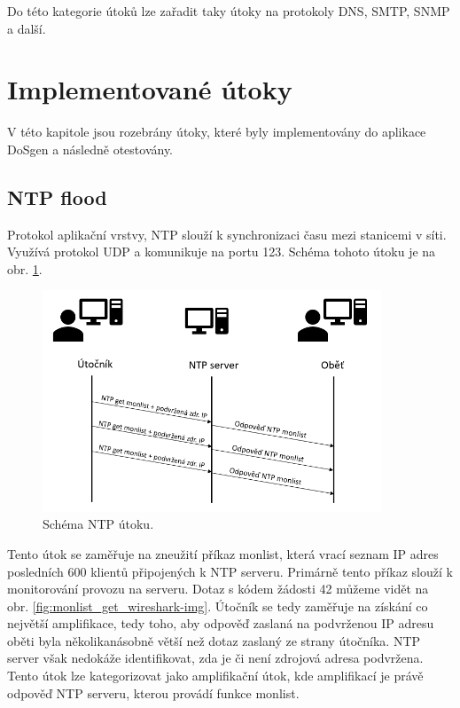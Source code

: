Do této kategorie útoků lze zařadit taky útoky na protokoly DNS, SMTP, SNMP a další.

\section{Implementované útoky}
\label{sec:implementovane_utoky}
V této kapitole jsou rozebrány útoky, které byly implementovány do aplikace DoSgen a následně otestovány.

\subsection{NTP flood}
\label{subsec:ntp_flood}
Protokol aplikační vrstvy, NTP slouží k synchronizaci času mezi stanicemi v síti.
Využívá protokol UDP a komunikuje na portu 123. Schéma tohoto útoku je na obr. \ref{fig:ntp_schema-img}.

\begin{figure} [ht]
	\centering
	\includegraphics[width=0.9\textwidth]{obrazky/ntp_flood_schema.png}
	\caption{Schéma NTP útoku.}
	\label{fig:ntp_schema-img}
\end{figure}

Tento útok se zaměřuje na zneužití příkaz monlist, která vrací seznam IP adres
posledních 600 klientů připojených k NTP serveru. Primárně tento příkaz slouží k
monitorování provozu na serveru. Dotaz s kódem žádosti 42  můžeme vidět
na obr. \ref{fig:monlist_get_wireshark-img}. Útočník se tedy zaměřuje na získání co
největší amplifikace, tedy toho, aby odpověď zaslaná na podvrženou IP adresu oběti
byla několikanásobně větší než dotaz zaslaný ze strany útočníka. NTP server však
nedokáže identifikovat, zda je či není zdrojová adresa podvržena.
Tento útok lze kategorizovat jako amplifikační útok, kde amplifikací je právě odpověď
NTP serveru, kterou provádí funkce monlist.

